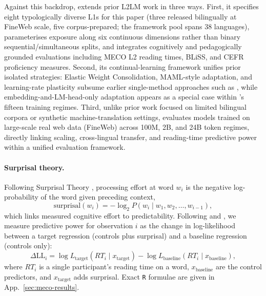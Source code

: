 Against this backdrop, \beetle{} extends prior L2LM work in three ways. First, it specifies eight typologically diverse L1s for this paper (three released bilingually at FineWeb scale, five corpus-prepared; the framework pool spans 38 languages), parameterises exposure along six continuous dimensions rather than binary sequential/simultaneous splits, and integrates cognitively and pedagogically grounded evaluations including MECO L2 reading times, BLiSS, and CEFR proficiency measures. Second, its continual-learning framework unifies prior isolated strategies: Elastic Weight Consolidation, MAML-style adaptation, and learning-rate plasticity subsume earlier single-method approaches such as \citet{constantinescu2025investigating}, while embedding-and-LM-head-only adaptation \citep{aoyama2024modeling} appears as a special case within \beetle{}’s fifteen training regimes. Third, unlike prior work focused on limited bilingual corpora or synthetic machine-translation settings, \beetle{} evaluates models trained on large-scale real web data (FineWeb) across 100M, 2B, and 24B token regimes, directly linking scaling, cross-lingual transfer, and reading-time predictive power within a unified evaluation framework.
 
\paragraph{Surprisal theory.} Following Surprisal Theory \citep{hale2001probabilistic, levy2008expectation}, processing effort at word $w_i$ is the negative log-probability of the word given preceding context,
\[
\mathrm{surprisal}(w_i) = -\log_2 P(w_i \mid w_1, w_2, \dots, w_{i-1}),
\]
which links measured cognitive effort to predictability. Following \citet{wilcox2020predictive} and \citet{kaye2025sentence}, we measure predictive power for observation $i$ as the change in log-likelihood between a target regression (controls plus surprisal) and a baseline regression (controls only):
\begin{equation}
\Delta\mathrm{LL}_i =
\log L_{\text{target}}(RT_i \mid x_{\text{target}})
- \log L_{\text{baseline}}(RT_i \mid x_{\text{baseline}}),
\end{equation}
where $RT_i$ is a single participant's reading time on a word, $x_{\text{baseline}}$ are the control predictors, and $x_{\text{target}}$ adds surprisal. Exact \texttt{R} formulae are given in App.~\ref{sec:meco-results}.
 
